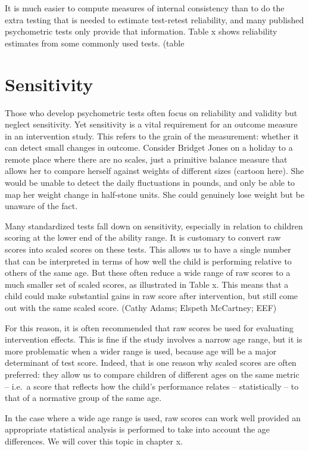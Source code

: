 \documentclass[]{book}
\begin{document}
It is much easier to compute measures of internal consistency than to do the extra testing that is needed to estimate test-retest reliability, and many published psychometric tests only provide that information. Table x shows reliability estimates from some commonly used tests.
(table

\hypertarget{sensitivity}{%
\section{Sensitivity}\label{sensitivity}}

Those who develop psychometric tests often focus on reliability and validity but neglect sensitivity. Yet sensitivity is a vital requirement for an outcome measure in an intervention study. This refers to the grain of the measurement: whether it can detect small changes in outcome. Consider Bridget Jones on a holiday to a remote place where there are no scales, just a primitive balance measure that allows her to compare herself against weights of different sizes (cartoon here). She would be unable to detect the daily fluctuations in pounds, and only be able to map her weight change in half-stone units. She could genuinely lose weight but be unaware of the fact.

Many standardized tests fall down on sensitivity, especially in relation to children scoring at the lower end of the ability range. It is customary to convert raw scores into scaled scores on these tests. This allows us to have a single number that can be interpreted in terms of how well the child is performing relative to others of the same age. But these often reduce a wide range of raw scores to a much smaller set of scaled scores, as illustrated in Table x. This means that a child could make substantial gains in raw score after intervention, but still come out with the same scaled score.
(Cathy Adams; Elspeth McCartney; EEF)

For this reason, it is often recommended that raw scores be used for evaluating intervention effects. This is fine if the study involves a narrow age range, but it is more problematic when a wider range is used, because age will be a major determinant of test score. Indeed, that is one reason why scaled scores are often preferred: they allow us to compare children of different ages on the same metric -- i.e.~a score that reflects how the child's performance relates -- statistically -- to that of a normative group of the same age.

In the case where a wide age range is used, raw scores can work well provided an appropriate statistical analysis is performed to take into account the age differences. We will cover this topic in chapter x.
\end{document}
